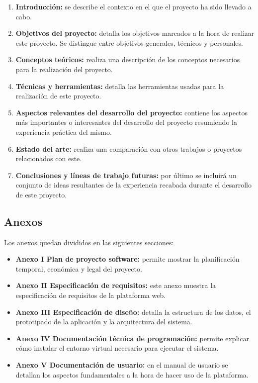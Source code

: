\begin{enumerate}
	\item \textbf{Introducción:} se describe el contexto en el que el proyecto ha sido llevado a cabo.
	\item \textbf{Objetivos del proyecto:} detalla los objetivos marcados a la hora de realizar este proyecto. Se distingue entre objetivos generales, técnicos y personales.
	\item \textbf{Conceptos teóricos:} realiza una descripción de los conceptos necesarios para la realización del proyecto.
	\item \textbf{Técnicas y herramientas:} detalla las herramientas usadas para la
realización de este proyecto.
	\item \textbf{Aspectos relevantes del desarrollo del proyecto:} contiene los aspectos más importantes o interesantes del desarrollo del proyecto resumiendo la experiencia práctica del mismo.
	\item \textbf{Estado del arte:} realiza una comparación con otros trabajos o proyectos relacionados con este.
	\item \textbf{Conclusiones y líneas de trabajo futuras:} por último se incluirá un conjunto de ideas resultantes de la experiencia recabada durante el desarrollo de este proyecto.
\end{enumerate}


\subsection{Anexos}
Los anexos quedan divididos en las siguientes secciones:

\begin{itemize}
	\item \textbf{Anexo I Plan de proyecto software:} permite mostrar la planificación temporal, económica y legal del proyecto.
	\item \textbf{Anexo II Especificación de requisitos:} este anexo muestra la especificación de requisitos de la plataforma web.
	\item \textbf{Anexo III Especificación de diseño:} detalla la estructura de los datos, el prototipado de la aplicación y la arquitectura del sistema.
	\item \textbf{Anexo IV Documentación técnica de programación:} permite explicar cómo instalar el entorno virtual necesario para ejecutar el sistema.
	\item \textbf{Anexo V Documentación de usuario:} en el manual de usuario se detallan los aspectos fundamentales a la hora de hacer uso de la plataforma.
	
\end{itemize}